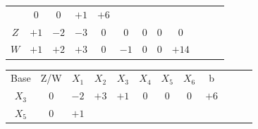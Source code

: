 \documentclass{beamer}
\begin{document}
\begin{frame}
{\begin{table}
\begin{tabular}{c c c c c c c c c c c c}
				& \cellcolor{yellow!50} $\scriptstyle 0$
				& \cellcolor{yellow!50} $\scriptstyle 0$
				& \cellcolor{yellow!50} $\scriptstyle +1$
				& \cellcolor{yellow!50} $\scriptstyle +6$ \\
				\cellcolor{blue!100} \color{white} $\scriptstyle Z$
				& \cellcolor{yellow!50} $\scriptstyle +1$
				& \cellcolor{yellow!50} $\scriptstyle -2$
				& \cellcolor{yellow!50} $\scriptstyle -3$
				& \cellcolor{yellow!50} $\scriptstyle 0$
				& \cellcolor{yellow!50} $\scriptstyle 0$
				& \cellcolor{yellow!50} $\scriptstyle 0$
				& \cellcolor{yellow!50} $\scriptstyle 0$ 
				& \cellcolor{yellow!50} $\scriptstyle 0$  \\
				\cellcolor{blue!100} \color{white} $\scriptstyle W$
				& \cellcolor{yellow!90} $\scriptstyle +1$
				& \cellcolor{yellow!90} $\scriptstyle +2$
				& \cellcolor{yellow!90} $\scriptstyle +3$
				& \cellcolor{yellow!90} $\scriptstyle 0$
				& \cellcolor{yellow!90} $\scriptstyle -1$
				& \cellcolor{yellow!90} $\scriptstyle 0$
				& \cellcolor{yellow!90} $\scriptstyle 0$ 
				& \cellcolor{yellow!90} $\scriptstyle +14$  \\
			\end{tabular}
		\end{table}			
	}
	{
		\begin{table}		
			\begin{tabular}{c c c c c c c c c c c c}
				\cline{1-8} 
				\cellcolor{blue!100} \color{white} \scriptsize Base 
				&\cellcolor{blue!100} \color{white} \scriptsize Z/W
				&\cellcolor{blue!100} \color{white} $\scriptstyle X_1$ 
				&\cellcolor{blue!100} \color{white} $\scriptstyle X_2$ 
				&\cellcolor{blue!100} \color{red}   $\scriptstyle X_3$ 
				&\cellcolor{blue!100} \color{white} $\scriptstyle X_4$ 
				&\cellcolor{blue!100} \color{red}   $\scriptstyle X_5$ 
				&\cellcolor{blue!100} \color{red}   $\scriptstyle X_6$ 
				&\cellcolor{blue!100} \color{white} \scriptsize b
				&
				&
				& \\
				\cellcolor{blue!100} \color{red} $\scriptstyle X_3$
				& \cellcolor{yellow!50} $\scriptstyle 0$
				& \cellcolor{yellow!50} $\scriptstyle -2$
				& \cellcolor{gray!50} $\scriptstyle +3$
				& \cellcolor{yellow!50} $\scriptstyle +1$
				& \cellcolor{yellow!50} $\scriptstyle 0$
				& \cellcolor{yellow!50} $\scriptstyle 0$
				& \cellcolor{yellow!50} $\scriptstyle 0$
				& \cellcolor{yellow!50} $\scriptstyle +6$ \\
			    \cellcolor{blue!100} \color{red} $\scriptstyle X_5$
				& \cellcolor{yellow!50} $\scriptstyle 0$
				& \cellcolor{yellow!50} $\scriptstyle +1$

\end{tabular}
\end{table}}
\end{frame}
\end{document}
